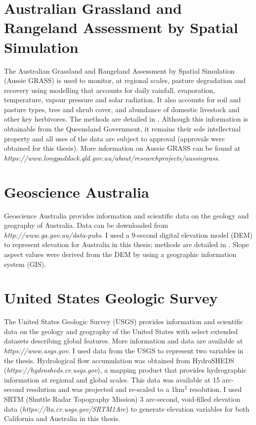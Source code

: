 \section{Australian Grassland and Rangeland Assessment by Spatial Simulation}

The Australian Grassland and Rangeland Assessment by Spatial Simulation (Aussie GRASS) is used to monitor, at regional scales, pasture degradation and recovery using modelling that accounts for daily rainfall, evaporation, temperature, vapour pressure and solar radiation. It also accounts for soil and pasture types, tree and shrub cover, and abundance of domestic livestock and other key herbivores. The methods are detailed in \cite{cart03}. Although this information is obtainable from the Queensland Government, it remains their sole intellectual property and all uses of the data are subject to approval (approvals were obtained for this thesis). More information on Aussie GRASS can be found at \textit{https://www.longpaddock.qld.gov.au/about/researchprojects/aussiegrass}.

\section{Geoscience Australia}

Geoscience Australia provides information and scientific data on the geology and geography of Australia. Data can be downloaded from \textit{http://www.ga.gov.au/data-pubs}. I used a 9-second digital elevation model (DEM) to represent elevation for Australia in this thesis; methods are detailed in \cite{hutc91,hutc11}. Slope aspect values were derived from the DEM by using a geographic information system (GIS).

\section{United States Geologic Survey}

The United States Geologic Survey (USGS) provides information and scientific data on the geology and geography of the United States with select extended datasets describing global features. More information and data are available at \textit{https://www.usgs.gov}. I used data from the USGS to represent two variables in the thesis. Hydrological flow accumulation was obtained from HydroSHEDS (\textit{https://hydrosheds.cr.usgs.gov}), a mapping product that provides hydrographic information at regional and global scales. This data was available at 15 arc-second resolution and was projected and re-scaled to a 1km$^2$ resolution. I used SRTM (Shuttle Radar Topography Mission) 3 arc-second, void-filled elevation data (\textit{https://lta.cr.usgs.gov/SRTM1Arc}) to generate elevation variables for both California and Australia in this thesis.

